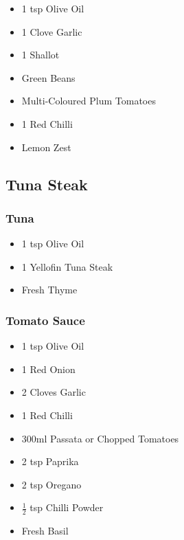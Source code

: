 \documentclass[11pt, english]{article}
\begin{document}
	\begin{itemize}
        \setlength\itemsep{0cm}
                \item 1 tsp Olive Oil
		\item 1 Clove Garlic
		\item 1 Shallot
		\item Green Beans
		\item Multi-Coloured Plum Tomatoes
		\item 1 Red Chilli
		\item Lemon Zest
        \end{itemize}

\newpage

	\subsection{Tuna Steak}

		\subsubsection*{Tuna}

	\begin{itemize}
        \setlength\itemsep{0cm}
                \item 1 tsp Olive Oil
		\item 1 Yellofin Tuna Steak
		\item Fresh Thyme
        \end{itemize}

		\subsubsection*{Tomato Sauce}

	\begin{itemize}
        \setlength\itemsep{0cm}
                \item 1 tsp Olive Oil
		\item 1 Red Onion
		\item 2 Cloves Garlic
		\item 1 Red Chilli
		\item 300ml Passata or Chopped Tomatoes
		\item 2 tsp Paprika
		\item 2 tsp Oregano
		\item $\frac{1}{2}$ tsp Chilli Powder
		\item Fresh Basil
        \end{itemize}

\newpage
\end{document}

